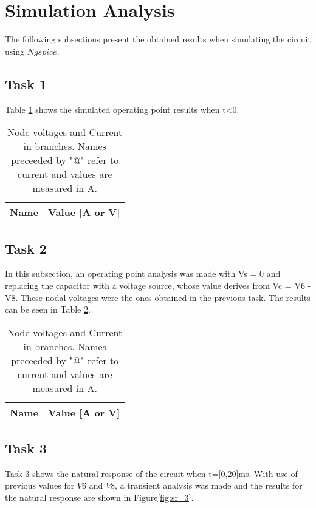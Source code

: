 \section{Simulation Analysis}
\label{sec:simulation}

The following subsections present the obtained results when simulating the circuit using $Ngspice$.

\subsection{Task 1}

Table \ref{tab:sr_1} shows the simulated operating point results when t<0.

\begin{table}[h]
  \centering
  \begin{tabular}{|l|r|}
    \hline    
    {\bf Name} & {\bf Value [A or V]} \\ \hline
    
  \end{tabular}
  \caption{Node voltages and Current in branches. Names preceeded by "@" refer to current and values are measured in A.}
  \label{tab:sr_1}
\end{table}

\subsection{Task 2}
In this subsection, an operating point analysis was made with Vs = 0 and replacing the capacitor with a voltage source, whose value derives from Vc = V6 - V8. These nodal voltages were the ones obtained in the previous task. The results can be seen in Table \ref{tab:sr_2}.

\begin{table}[h]
  \centering
  \begin{tabular}{|l|r|}
    \hline    
    {\bf Name} & {\bf Value [A or V]} \\ \hline
    
  \end{tabular}
  \caption{Node voltages and Current in branches. Names preceeded by "@" refer to current and values are measured in A.}
  \label{tab:sr_2}
\end{table}

\subsection{Task 3}
Task 3 shows the natural response of the circuit when t=[0,20]ms. With use of previous values for $V6$ and $V8$, a transient analysis was made and the results for the natural response are shown in Figure\ref{fig:sr_3}.

